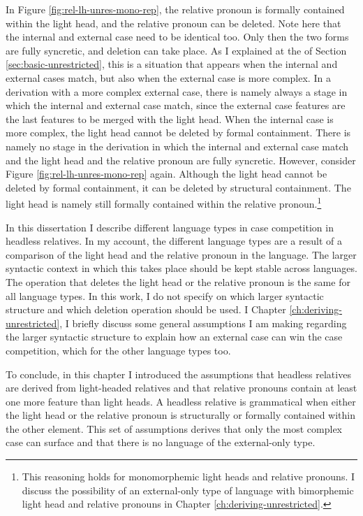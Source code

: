 In Figure \ref{fig:rel-lh-unres-mono-rep}, the relative pronoun is formally contained within the light head, and the relative pronoun can be deleted. Note here that the internal and external case need to be identical too. Only then the two forms are fully syncretic, and deletion can take place.
As I explained at the of Section \ref{sec:basic-unrestricted}, this is a situation that appears when the internal and external cases match, but also when the external case is more complex. In a derivation with a more complex external case, there is namely always a stage in which the internal and external case match, since the external case features are the last features to be merged with the light head.
When the internal case is more complex, the light head cannot be deleted by formal containment. There is namely no stage in the derivation in which the internal and external case match and the light head and the relative pronoun are fully syncretic.
However, consider Figure \ref{fig:rel-lh-unres-mono-rep} again.
Although the light head cannot be deleted by formal containment, it can be deleted by structural containment. The light head is namely still formally contained within the relative pronoun.\footnote{This reasoning holds for monomorphemic light heads and relative pronouns. I discuss the possibility of an external-only type of language with bimorphemic light head and relative pronouns in Chapter \ref{ch:deriving-unrestricted}.}

In this dissertation I describe different language types in case competition in headless relatives. In my account, the different language types are a result of a comparison of the light head and the relative pronoun in the language.
The larger syntactic context in which this takes place should be kept stable across languages. The operation that deletes the light head or the relative pronoun is the same for all language types. In this work, I do not specify on which larger syntactic structure and which deletion operation should be used. I Chapter \ref{ch:deriving-unrestricted}, I briefly discuss some general assumptions I am making regarding the larger syntactic structure to explain how an external case can win the case competition, which for the other language types too.

To conclude, in this chapter I introduced the assumptions that headless relatives are derived from light-headed relatives and that relative pronouns contain at least one more feature than light heads. A headless relative is grammatical when either the light head or the relative pronoun is structurally or formally contained within the other element. This set of assumptions derives that only the most complex case can surface and that there is no language of the external-only type.

